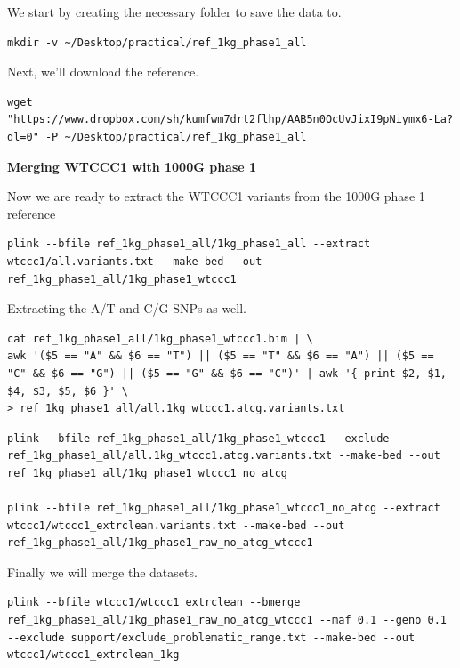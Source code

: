 \documentclass[
]{book}
\begin{document}
We start by creating the necessary folder to save the data to.

\begin{verbatim}
mkdir -v ~/Desktop/practical/ref_1kg_phase1_all
\end{verbatim}

Next, we'll download the reference.

\begin{verbatim}
wget "https://www.dropbox.com/sh/kumfwm7drt2flhp/AAB5n0OcUvJixI9pNiymx6-La?dl=0" -P ~/Desktop/practical/ref_1kg_phase1_all
\end{verbatim}

\textbf{Merging WTCCC1 with 1000G phase 1}

Now we are ready to extract the WTCCC1 variants from the 1000G phase 1 reference

\begin{verbatim}
plink --bfile ref_1kg_phase1_all/1kg_phase1_all --extract wtccc1/all.variants.txt --make-bed --out ref_1kg_phase1_all/1kg_phase1_wtccc1
\end{verbatim}

Extracting the A/T and C/G SNPs as well.

\begin{verbatim}
cat ref_1kg_phase1_all/1kg_phase1_wtccc1.bim | \
awk '($5 == "A" && $6 == "T") || ($5 == "T" && $6 == "A") || ($5 == "C" && $6 == "G") || ($5 == "G" && $6 == "C")' | awk '{ print $2, $1, $4, $3, $5, $6 }' \
> ref_1kg_phase1_all/all.1kg_wtccc1.atcg.variants.txt
\end{verbatim}

\begin{verbatim}
plink --bfile ref_1kg_phase1_all/1kg_phase1_wtccc1 --exclude ref_1kg_phase1_all/all.1kg_wtccc1.atcg.variants.txt --make-bed --out ref_1kg_phase1_all/1kg_phase1_wtccc1_no_atcg

plink --bfile ref_1kg_phase1_all/1kg_phase1_wtccc1_no_atcg --extract wtccc1/wtccc1_extrclean.variants.txt --make-bed --out ref_1kg_phase1_all/1kg_phase1_raw_no_atcg_wtccc1
\end{verbatim}

Finally we will merge the datasets.

\begin{verbatim}
plink --bfile wtccc1/wtccc1_extrclean --bmerge ref_1kg_phase1_all/1kg_phase1_raw_no_atcg_wtccc1 --maf 0.1 --geno 0.1 --exclude support/exclude_problematic_range.txt --make-bed --out wtccc1/wtccc1_extrclean_1kg
\end{verbatim}
\end{document}
